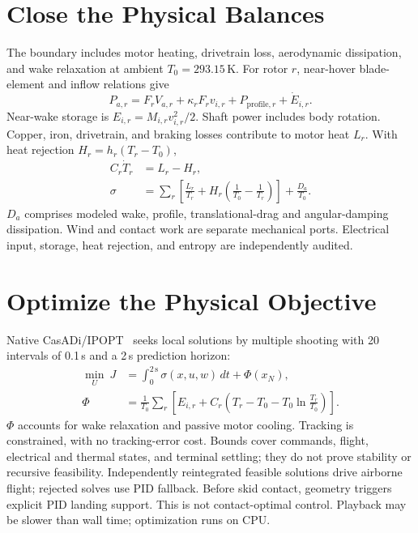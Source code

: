 \section{Close the Physical Balances}
The boundary includes motor heating, drivetrain loss, aerodynamic
dissipation, and wake relaxation at ambient $T_0=293.15$\,K. For rotor $r$,
near-hover blade-element and inflow relations give~\cite{johnson2015}
\begin{equation}
P_{a,r}=F_r V_{a,r}+\kappa_r F_r v_{i,r}
       +P_{\mathrm{profile},r}+\dot E_{i,r}.
\end{equation}
Near-wake storage is $E_{i,r}=M_{i,r}v_{i,r}^2/2$.
Shaft power includes body rotation. Copper, iron, drivetrain, and braking losses
contribute to motor heat $L_r$. With heat rejection $H_r=h_r(T_r-T_0)$,
\begin{equation}
\begin{aligned}
C_r\dot T_r&=L_r-H_r,\\
\sigma&=\sum_r\left[\frac{L_r}{T_r}
 +H_r\left(\frac1{T_0}-\frac1{T_r}\right)\right]
 +\frac{D_a}{T_0}.
\end{aligned}
\end{equation}
$D_a$ comprises modeled wake, profile, translational-drag and angular-damping
dissipation. Wind and contact work are separate mechanical ports. Electrical
input, storage, heat rejection, and entropy are independently audited.

\section{Optimize the Physical Objective}
Native CasADi/IPOPT~\cite{casadi} seeks local solutions by multiple shooting with 20
intervals of 0.1\,s and a 2\,s prediction horizon:
\begin{equation}
\begin{aligned}
\min_U\ J&=\int_0^{2\,\mathrm{s}}\!\sigma(x,u,w)\,dt+\Phi(x_N),\\
\Phi&=\frac1{T_0}\sum_r\left[E_{i,r}
+C_r\left(T_r-T_0-T_0\ln\frac{T_r}{T_0}\right)\right].
\end{aligned}
\end{equation}
$\Phi$ accounts for wake relaxation and passive motor cooling.
Tracking is constrained, with no tracking-error cost. Bounds cover commands,
flight, electrical and thermal states, and terminal settling; they do not
prove stability or recursive feasibility.
Independently reintegrated feasible solutions drive airborne flight; rejected
solves use PID fallback. Before skid contact, geometry triggers explicit PID
landing support. This is not contact-optimal control. Playback may be
slower than wall time; optimization runs on CPU.

